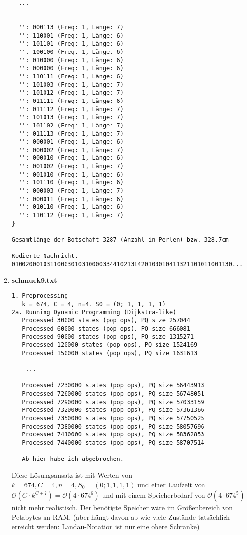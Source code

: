 \documentclass[a4paper,10pt,ngerman]{scrartcl}
\begin{document}
\begin{enumerate}
\begin{verbatim}
  ...

 
  '': 000113 (Freq: 1, Länge: 7)
  '': 110001 (Freq: 1, Länge: 6)
  '': 101101 (Freq: 1, Länge: 6)
  '': 100100 (Freq: 1, Länge: 6)
  '': 010000 (Freq: 1, Länge: 6)
  '': 000000 (Freq: 1, Länge: 6)
  '': 110111 (Freq: 1, Länge: 6)
  '': 101003 (Freq: 1, Länge: 7)
  '': 101012 (Freq: 1, Länge: 7)
  '': 011111 (Freq: 1, Länge: 6)
  '': 011112 (Freq: 1, Länge: 7)
  '': 101013 (Freq: 1, Länge: 7)
  '': 101102 (Freq: 1, Länge: 7)
  '': 011113 (Freq: 1, Länge: 7)
  '': 000001 (Freq: 1, Länge: 6)
  '': 000002 (Freq: 1, Länge: 7)
  '': 000010 (Freq: 1, Länge: 6)
  '': 001002 (Freq: 1, Länge: 7)
  '': 001010 (Freq: 1, Länge: 6)
  '': 101110 (Freq: 1, Länge: 6)
  '': 000003 (Freq: 1, Länge: 7)
  '': 000011 (Freq: 1, Länge: 6)
  '': 010110 (Freq: 1, Länge: 6)
  '': 110112 (Freq: 1, Länge: 7)
}

Gesamtlänge der Botschaft 3287 (Anzahl in Perlen) bzw. 328.7cm

Kodierte Nachricht: 010020001031100030103100003344102131420103010411321101011001130...
\end{verbatim}
\item \textbf{schmuck9.txt}

\begin{verbatim}
1. Preprocessing
   k = 674, C = 4, n=4, S0 = (0; 1, 1, 1, 1)
2a. Running Dynamic Programming (Dijkstra-like)
   Processed 30000 states (pop ops), PQ size 257044
   Processed 60000 states (pop ops), PQ size 666081
   Processed 90000 states (pop ops), PQ size 1315271
   Processed 120000 states (pop ops), PQ size 1524169
   Processed 150000 states (pop ops), PQ size 1631613

    ...

   Processed 7230000 states (pop ops), PQ size 56443913
   Processed 7260000 states (pop ops), PQ size 56748051
   Processed 7290000 states (pop ops), PQ size 57033159
   Processed 7320000 states (pop ops), PQ size 57361366
   Processed 7350000 states (pop ops), PQ size 57750525
   Processed 7380000 states (pop ops), PQ size 58057696
   Processed 7410000 states (pop ops), PQ size 58362853
   Processed 7440000 states (pop ops), PQ size 58707514

   Ab hier habe ich abgebrochen. 
\end{verbatim}
Diese Lösungsansatz ist mit Werten von $k = 674, C = 4, n=4, S_0 = (0; 1, 1, 1, 1)$ und einer Laufzeit von $\mathcal{O}(C\cdot k^{C+2})=\mathcal{O}(4\cdot674^{6})$ und mit einem Speicherbedarf von $\mathcal{O}(4\cdot 674^{5})$ nicht mehr realistisch. Der benötigte Speicher wäre im Größenbereich von Petabytes an RAM, (aber hängt davon ab wie viele Zustände tatsächlich erreicht werden: Landau-Notation ist nur eine obere Schranke)
\end{enumerate}
\end{document}
